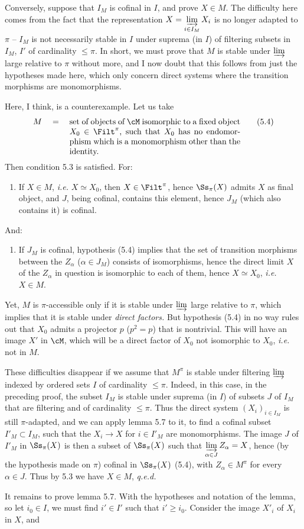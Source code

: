 Conversely, suppose that $I_M$ is cofinal in $I$, and prove $X \in M$. The difficulty here comes from the fact that the representation $X = \varinjlim\limits_{i\in I_M} X_i$ is no longer adapted to $\pi$ -- $I_M$ is not necessarily stable in $I$ under suprema (in $I$) of filtering subsets in $I_M$, $I'$ of cardinality $\leq \pi$. In short, we must
prove that $M$ is stable under $\varinjlim$ large relative to $\pi$ without more, and I now doubt that this follows from just the hypotheses made here, which only concern direct systems where the transition morphisms are monomorphisms.

Here, I think, is a counterexample. Let us take
\[
M \quad = \quad \parbox[t]{0.6\textwidth}{set of objects of $\cM$ isomorphic to a fixed object $X_0 \in \Filt^{\pi}$, such that $X_0$ has no endomorphism which is a monomorphism other than the identity.}
\tag*{(5.4)}
\]
Then condition 5.3 is satisfied. For:
\begin{enumerate}[nosep]
\item[\textit{a})] If $X \in M$, \textit{i.e.} $X \simeq X_0$, then $X \in \Filt^{\pi}$, hence $\Ss_{\pi}(X)$ admits $X$ as final object, and $J$, being cofinal, contains this element, hence $J_M$ (which also contains it) is cofinal.
\end{enumerate}
And:
\begin{enumerate}[nosep]
\item[\textit{b})] If $J_M$ is cofinal, hypothesis (5.4) implies that the set of transition morphisms between the $Z_{\alpha}$ ($\alpha \in J_M$) consists of isomorphisms, hence the direct limit $X$ of the $Z_{\alpha}$ in question is isomorphic to each of them, hence $X \simeq X_0$, \textit{i.e.} $X \in M$.
\end{enumerate}
Yet, $M$ is $\pi$-accessible only if it is stable under $\varinjlim$ large relative to $\pi$, which implies that it is stable under \textit{direct factors.} But hypothesis
(5.4) in no way rules out that $X_0$ admits a projector $p$ ($p^{2} = p$) that is nontrivial. This will have an image $X'$ in $\cM$, which will be a direct factor of $X_0$ not isomorphic to $X_0$, \textit{i.e.} not in $M$.

These difficulties disappear if we assume that $M^{\pi}$ is stable under filtering $\varinjlim$ indexed by ordered sets $I$ of cardinality $\leq \pi$. Indeed, in this case, in the preceding proof, the subset $I_M$ is stable under suprema (in $I$) of subsets $J$ of $I_M$ that are filtering and of cardinality $\leq \pi$. Thus the direct system $(X_i)_{i\in I_M}$ is still $\pi$-adapted, and we can apply lemma 5.7 to it, to find a cofinal subset $I'_M \subset I_M$, such that the $X_i \longrightarrow X$ for $i \in I'_M$ are monomorphisms. The image $J$ of $I'_M$ in $\Ss_{\pi}(X)$ is then a subset of $\Ss_{\pi}(X)$ such that $\varinjlim\limits_{\alpha\in J} Z_{\alpha} = X$, hence (by the hypothesis made on $\pi$) cofinal in $\Ss_{\pi}(X)$ (5.4), with $Z_{\alpha} \in M^{\pi}$ for every $\alpha \in J$. Thus by 5.3 we have $X \in M$, \textit{q.e.d.}

It remains to prove lemma 5.7. With the hypotheses and notation of the lemma, so let $i_0 \in I$, we must find $i' \in I'$ such that $i' \geq i_0$. Consider the image $X'_i$ of $X_i$ in $X$, and
